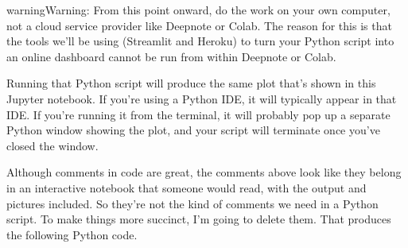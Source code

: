 \documentclass[letterpaper,10pt,english]{jupyterBook}
\begin{document}
\begin{sphinxVerbatim}[commandchars=\\\{\}]


   
  \PYG{p}{[}      \PYG{p}{]}
   





     
\end{sphinxVerbatim}

\begin{sphinxadmonition}{warning}{Warning:}
\sphinxAtStartPar
From this point onward, do the work on your own computer, not a cloud service provider like Deepnote or Colab.  The reason for this is that the tools we’ll be using (Streamlit and Heroku) to turn your Python script into an online dashboard cannot be run from within Deepnote or Colab.
\end{sphinxadmonition}

\sphinxAtStartPar
Running that Python script will produce the same plot that’s shown in this Jupyter notebook.  If you’re using a Python IDE, it will typically appear in that IDE.  If you’re running it from the terminal, it will probably pop up a separate Python window showing the plot, and your script will terminate once you’ve closed the window.

\sphinxAtStartPar
Although comments in code are great, the comments above look like they belong in an interactive notebook that someone would read, with the output and pictures included.  So they’re not the kind of comments we need in a Python script.  To make things more succinct, I’m going to delete them.  That produces the following Python code.
\end{document}
